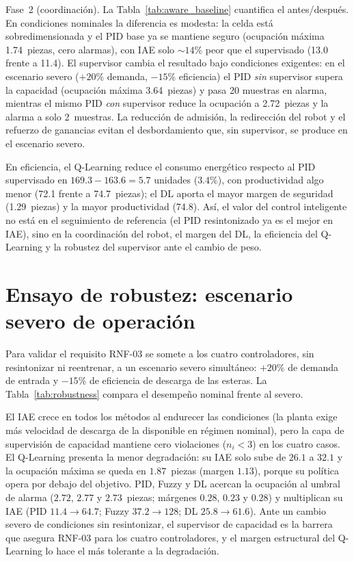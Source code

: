 Fase~2 (coordinación). La Tabla~\ref{tab:aware_baseline} cuantifica el antes/después. En condiciones nominales la diferencia es modesta: la celda está sobredimensionada y el PID base ya se mantiene seguro (ocupación máxima 1.74~piezas, cero alarmas), con IAE solo $\sim14\%$ peor que el supervisado (13.0 frente a 11.4). El supervisor cambia el resultado bajo condiciones exigentes: en el escenario severo ($+20\%$ demanda, $-15\%$ eficiencia) el PID \emph{sin} supervisor supera la capacidad (ocupación máxima 3.64~piezas) y pasa 20 muestras en alarma, mientras el mismo PID \emph{con} supervisor reduce la ocupación a 2.72~piezas y la alarma a solo 2~muestras. La reducción de admisión, la redirección del robot y el refuerzo de ganancias evitan el desbordamiento que, sin supervisor, se produce en el escenario severo.



En eficiencia, el Q-Learning reduce el consumo energético respecto al PID supervisado en $169.3 - 163.6 = 5.7$ unidades ($3.4\%$), con productividad algo menor (72.1 frente a 74.7~piezas); el DL aporta el mayor margen de seguridad (1.29~piezas) y la mayor productividad (74.8). Así, el valor del control inteligente no está en el seguimiento de referencia (el PID resintonizado ya es el mejor en IAE), sino en la coordinación del robot, el margen del DL, la eficiencia del Q-Learning y la robustez del supervisor ante el cambio de peso.

\section{Ensayo de robustez: escenario severo de operación}
\label{sec:robustez_severa}

Para validar el requisito RNF-03 se somete a los cuatro controladores, sin resintonizar ni reentrenar, a un escenario severo simultáneo: $+20\%$ de demanda de entrada y $-15\%$ de eficiencia de descarga de las esteras. La Tabla~\ref{tab:robustness} compara el desempeño nominal frente al severo.



El IAE crece en todos los métodos al endurecer las condiciones (la planta exige más velocidad de descarga de la disponible en régimen nominal), pero la capa de supervisión de capacidad mantiene cero violaciones ($n_i<3$) en los cuatro casos. El Q-Learning presenta la menor degradación: su IAE solo sube de $26.1$ a $32.1$ y la ocupación máxima se queda en $1.87$~piezas (margen $1.13$), porque su política opera por debajo del objetivo. PID, Fuzzy y DL acercan la ocupación al umbral de alarma ($2.72$, $2.77$ y $2.73$~piezas; márgenes $0.28$, $0.23$ y $0.28$) y multiplican su IAE (PID $11.4\to64.7$; Fuzzy $37.2\to128$; DL $25.8\to61.6$). Ante un cambio severo de condiciones sin resintonizar, el supervisor de capacidad es la barrera que asegura RNF-03 para los cuatro controladores, y el margen estructural del Q-Learning lo hace el más tolerante a la degradación.

